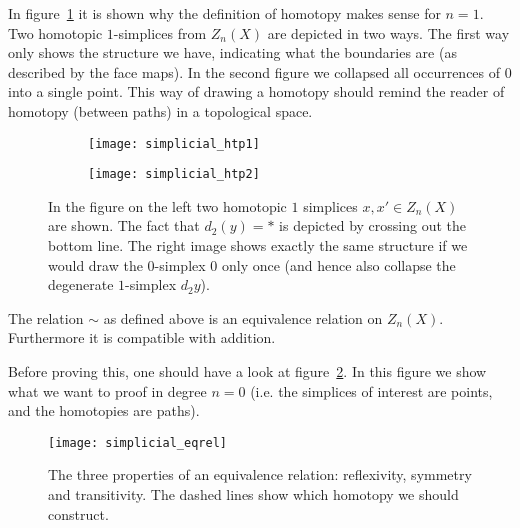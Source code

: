In figure~\ref{fig:simplicial_htp} it is shown why the definition of homotopy makes sense for $n=1$. Two homotopic $1$-simplices from $Z_n(X)$ are depicted in two ways. The first way only shows the structure we have, indicating what the boundaries are (as described by the face maps). In the second figure we collapsed all occurrences of $0$ into a single point. This way of drawing a homotopy should remind the reader of homotopy (between paths) in a topological space.

\begin{figure}[h!]
\begin{subfigure}{.5\textwidth}
  \centering
  \texttt{[image: simplicial\_htp1]}
\end{subfigure}%
\begin{subfigure}{.5\textwidth}
  \centering
  \texttt{[image: simplicial\_htp2]}
\end{subfigure}
\caption{In the figure on the left two homotopic $1$ simplices $x, x' \in Z_n(X)$ are shown. The fact that $d_2(y) = \ast$ is depicted by crossing out the bottom line. The right image shows exactly the same structure if we would draw the $0$-simplex $0$ only once (and hence also collapse the degenerate $1$-simplex $d_2y$).}
\label{fig:simplicial_htp}
\end{figure}

\begin{lemma}
	The relation $\sim$ as defined above is an equivalence relation on $Z_n(X)$. Furthermore it is compatible with addition.
\end{lemma}

Before proving this, one should have a look at figure~\ref{fig:simplicial_eqrel}. In this figure we show what we want to proof in degree $n=0$ (i.e. the simplices of interest are points, and the homotopies are paths).

\begin{figure}[h!]
\texttt{[image: simplicial\_eqrel]}
\caption{The three properties of an equivalence relation: reflexivity, symmetry and transitivity. The dashed lines show which homotopy we should construct.}
\label{fig:simplicial_eqrel}
\end{figure}


